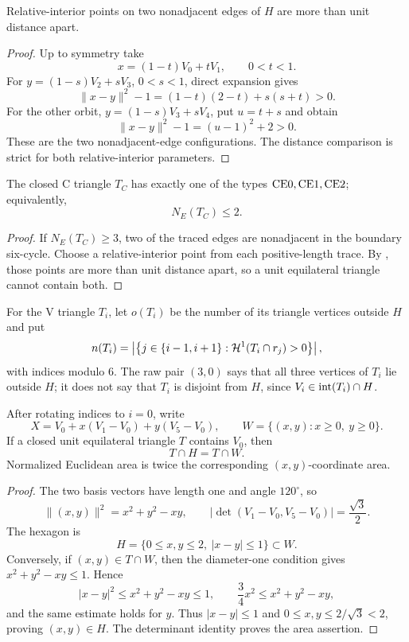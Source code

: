 \begin{lemma}
\label{lem:app-center-edge-separation}
Relative-interior points on two nonadjacent edges of $H$ are more than unit
distance apart.
\end{lemma}

\begin{proof}
Up to symmetry take
\[
 x=(1-t)V_0+tV_1,\qquad 0<t<1.
\]
For $y=(1-s)V_2+sV_3$, $0<s<1$, direct expansion gives
\[
 \lVert x-y\rVert^2-1=(1-t)(2-t)+s(s+t)>0.
\]
For the other orbit, $y=(1-s)V_3+sV_4$, put $u=t+s$ and obtain
\[
 \lVert x-y\rVert^2-1=(u-1)^2+2>0.
\]
These are the two nonadjacent-edge configurations.  The distance comparison is strict for both relative-interior parameters.
\end{proof}

\begin{proposition}
\label{prop:ce-classification}
The closed C triangle $T_C$ has exactly one of the types
$\mathrm{CE0},\mathrm{CE1},\mathrm{CE2}$;
equivalently,
\[
 N_E(T_C)\le2.
\]
\end{proposition}

\begin{proof}
If $N_E(T_C)\ge3$, two of the traced edges are nonadjacent in the boundary
six-cycle.  Choose a relative-interior point from each positive-length trace.
By , those points are more than unit
distance apart, so a unit equilateral triangle cannot contain both.
\end{proof}



For the V triangle $T_i$, let $o(T_i)$ be the number of its triangle vertices
outside $H$ and put
\[
 n(T_i)=\left\lvert\left\{j\in\{i-1,i+1\}:
 \mathcal H^1(T_i\cap r_j)>0\right\}\right\rvert,
\]
with indices modulo $6$.  The raw pair $(3,0)$ says that all three vertices of
$T_i$ lie outside $H$; it does not say that $T_i$ is disjoint from $H$, since
$V_i\in\mathrm{int}(T_i)\cap H$.

\begin{lemma}
\label{lem:shared-corner-chart}
After rotating indices to $i=0$, write
\[
 X=V_0+x(V_1-V_0)+y(V_5-V_0),
 \qquad W=\{(x,y):x\ge0,\ y\ge0\}.
\]
If a closed unit equilateral triangle $T$ contains $V_0$, then
\[
 T\cap H=T\cap W.
\]
Normalized Euclidean area is twice the corresponding $(x,y)$-coordinate
area.
\end{lemma}

\begin{proof}
The two basis vectors have length one and angle $120^\circ$, so
\[
 \lVert(x,y)\rVert^2=x^2+y^2-xy,
 \qquad
 \left\lvert\det(V_1-V_0,V_5-V_0)\right\rvert=\frac{\sqrt3}{2}.
\]
The hexagon is
\[
 H=\{0\le x,y\le2,\ |x-y|\le1\}\subset W.
\]
Conversely, if $(x,y)\in T\cap W$, then the diameter-one condition gives
$x^2+y^2-xy\le1$.  Hence
\[
 |x-y|^2\le x^2+y^2-xy\le1,
 \qquad
 \frac34x^2\le x^2+y^2-xy,
\]
and the same estimate holds for $y$.  Thus $|x-y|\le1$ and
$0\le x,y\le2/\sqrt3<2$, proving $(x,y)\in H$.  The determinant identity
proves the area assertion.
\end{proof}

